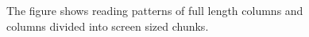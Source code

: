 \begin{figure}[h!tp]
	\qquad
	\caption{The figure shows reading patterns of full length columns and columns divided into screen sized chunks.}%
	\label{fig:reading}
\end{figure}
